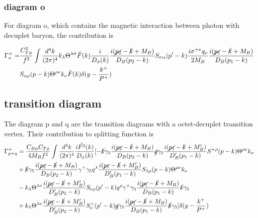 \documentclass[preprintnumbers,prd,superscriptaddress,preprint]{revtex4-1}
\begin{document}
	
	\subsubsection{diagram o}
	
	For diagram o, which contains the magnetic interaction between photon
	with decuplet baryon, the contribution is 
	
	\begin{align*}
		\Gamma_{o}^{+}= & \frac{C_{T\phi}^{2}}{f^{2}}\int\frac{d^{4}k}{(2\pi)^{4}}k_{\lambda}\Theta^{\lambda\sigma}\tilde{F}(k)\frac{i}{D_{\phi}(k)}\frac{i(\cancel{p_{2}}-\cancel{k}+M_{B})}{D_{B}(p_{2}-k)}S_{\sigma\alpha}(p'-k)\frac{i\sigma^{+\nu}q_{\nu}}{2M_{B}}\frac{i(\cancel{p_{1}}-\cancel{k}+M_{B})}{D_{B}(p_{1}-k)}\\
		& S_{\alpha\rho}(p-k)\Theta^{\rho\nu}k_{\nu}\tilde{F}(k)\delta(y-\frac{k^{+}}{P^{+}})
	\end{align*}
	
	
	\subsection{transition diagram}
	
	The diagram p and q are the transition diagrams with a octet-decuplet
	transition vertex. Their contribution to splitting function is 
	\begin{align}
		\Gamma_{p+q}^{+} & =\frac{C_{B\phi}C_{T\phi}}{4M_{B}f^{2}}\int\frac{d^{4}k}{(2\pi)^{4}}\frac{i\tilde{F^{2}}(k)}{D_{\phi}(k)}[-\cancel{k}\gamma_{5}\frac{i(\cancel{p_{2}}-\cancel{k}+M_{B})}{D_{B}(p_{2}-k)}\cancel{q}\gamma_{5}\frac{i(\cancel{p_{1}}-\cancel{k}+M'_{B})}{D'_{B}(p_{1}-k)}S^{+\rho}(p-k)\Theta^{\rho\nu}k_{\nu}\\
		& +\cancel{k}\gamma_{5}\frac{i(\cancel{p_{2}}-\cancel{k}+M_{B})}{D_{B}(p_{2}-k)}\gamma^{+}\gamma_{5}q^{\lambda}\frac{i(\cancel{p_{1}}-\cancel{k}+M'_{B})}{D'_{B}(p_{1}-k)}S_{\lambda\rho}(p-k)\Theta^{\rho\nu}k_{\nu}\\
		& -k_{\lambda}\Theta^{\lambda\nu}\frac{i(\cancel{p_{2}}-\cancel{k}+M'_{B})}{D'_{B}(p_{2}-k)}S_{\nu\rho}(p'-k)q^{\rho}\gamma^{+}\gamma_{5}\frac{i(\cancel{p_{1}}-\cancel{k}+M_{B})}{D_{B}(p_{1}-k)}\cancel{k}\gamma_{5}\\
		& +k_{\lambda}\Theta^{\lambda\nu}\frac{i(\cancel{p_{2}}-\cancel{k}+M'_{B})}{D'_{B}(p_{2}-k)}S_{\nu}^{+}(p'-k)\cancel{q}\gamma_{5}\frac{i(\cancel{p_{1}}-\cancel{k}+M_{B})}{D_{B}(p_{1}-k)}\cancel{k}\gamma_{5}]\delta(y-\frac{k^{+}}{P^{+}})
	\end{align}
	
\end{document}
